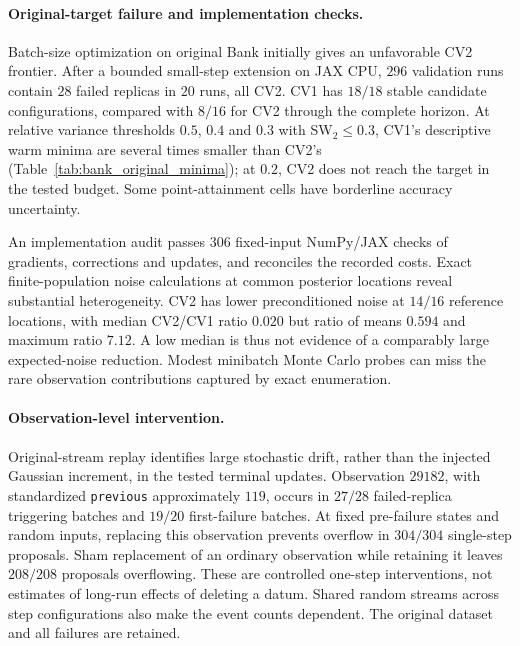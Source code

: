 \paragraph{Original-target failure and implementation checks.}
Batch-size optimization on original Bank initially gives an unfavorable CV2 frontier. After a bounded small-step extension on JAX CPU, $296$ validation runs contain $28$ failed replicas in $20$ runs, all CV2. CV1 has $18/18$ stable candidate configurations, compared with $8/16$ for CV2 through the complete horizon. At relative variance thresholds $0.5$, $0.4$ and $0.3$ with SW$_2\leq0.3$, CV1's descriptive warm minima are several times smaller than CV2's (Table~\ref{tab:bank_original_minima}); at $0.2$, CV2 does not reach the target in the tested budget. Some point-attainment cells have borderline accuracy uncertainty.


An implementation audit passes $306$ fixed-input NumPy/JAX checks of gradients, corrections and updates, and reconciles the recorded costs. Exact finite-population noise calculations at common posterior locations reveal substantial heterogeneity. CV2 has lower preconditioned noise at $14/16$ reference locations, with median CV2/CV1 ratio $0.020$ but ratio of means $0.594$ and maximum ratio $7.12$. A low median is thus not evidence of a comparably large expected-noise reduction. Modest minibatch Monte Carlo probes can miss the rare observation contributions captured by exact enumeration.

\paragraph{Observation-level intervention.}
Original-stream replay identifies large stochastic drift, rather than the injected Gaussian increment, in the tested terminal updates. Observation $29182$, with standardized \texttt{previous} approximately $119$, occurs in $27/28$ failed-replica triggering batches and $19/20$ first-failure batches. At fixed pre-failure states and random inputs, replacing this observation prevents overflow in $304/304$ single-step proposals. Sham replacement of an ordinary observation while retaining it leaves $208/208$ proposals overflowing. These are controlled one-step interventions, not estimates of long-run effects of deleting a datum. Shared random streams across step configurations also make the event counts dependent. The original dataset and all failures are retained.

